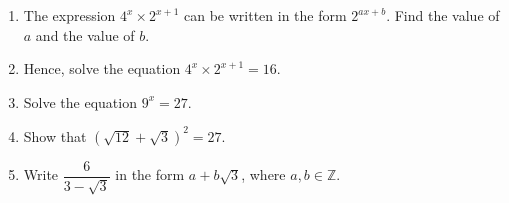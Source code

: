 \documentclass[12pt, twoside]{article}
\begin{document}
\begin{enumerate}[itemsep=0.15cm]
\begin{enumerate}[itemsep=0.1cm]
  \item The expression $4^{x} \times 2^{x + 1}$ can be written in the form
  $2^{ax + b}$. Find the value of $a$ and the value of $b$.
  \item Hence, solve the equation $4^{x} \times 2^{x + 1} = 16$.
  \item Solve the equation $9^{x} = 27$.
  \item Show that $\left(\sqrt{12} + \sqrt{3}\right)^{2} = 27$.
  \item Write $\dfrac{6}{3 - \sqrt{3}}$ in the form $a + b\sqrt{3}$,
  where $a, b \in \mathbb{Z}$.
\end{enumerate}


\end{enumerate}
\end{document}
